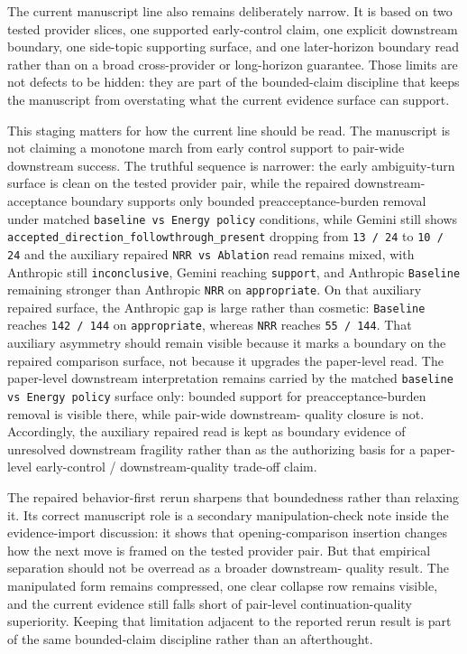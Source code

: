 \documentclass[11pt]{article}
\begin{document}
The current manuscript line also remains deliberately narrow. It is based on
two tested provider slices, one supported early-control claim, one explicit
downstream boundary, one side-topic supporting surface, and one later-horizon
boundary read rather than on a broad cross-provider or long-horizon guarantee.
Those limits are not defects to be hidden: they are part of the bounded-claim
discipline that keeps the manuscript from overstating what the current evidence
surface can support.

This staging matters for how the current line should be read. The manuscript is
not claiming a monotone march from early control support to pair-wide
downstream success. The truthful sequence is narrower: the early ambiguity-turn
surface is clean on the tested provider pair, while the repaired downstream-
acceptance boundary supports only bounded preacceptance-burden removal under
matched \texttt{baseline vs Energy policy} conditions, while Gemini still
shows \texttt{accepted\_direction\_followthrough\_present} dropping from
\texttt{13 / 24} to \texttt{10 / 24} and the auxiliary repaired
\texttt{NRR vs Ablation} read remains mixed, with Anthropic still
\texttt{inconclusive}, Gemini reaching \texttt{support}, and Anthropic
\texttt{Baseline} remaining stronger than Anthropic \texttt{NRR} on
\texttt{appropriate}. On that auxiliary repaired surface, the Anthropic gap is
large rather than cosmetic: \texttt{Baseline} reaches \texttt{142 / 144} on
\texttt{appropriate}, whereas \texttt{NRR} reaches \texttt{55 / 144}. That
auxiliary asymmetry should remain visible because it marks a boundary on the
repaired comparison surface, not because it upgrades the paper-level read. The
paper-level downstream interpretation remains carried by the matched
\texttt{baseline vs Energy policy} surface only: bounded support for
preacceptance-burden removal is visible there, while pair-wide downstream-
quality closure is not. Accordingly, the auxiliary repaired read is kept as
boundary evidence of unresolved downstream fragility rather than as the
authorizing basis for a paper-level early-control / downstream-quality trade-off
claim.

The repaired behavior-first rerun sharpens that boundedness rather than
relaxing it. Its correct manuscript role is a secondary manipulation-check note
inside the evidence-import discussion: it shows that opening-comparison
insertion changes how the next move is framed on the tested provider pair. But
that empirical separation should not be overread as a broader downstream-
quality result. The manipulated form remains compressed, one clear collapse row
remains visible, and the current evidence still falls short of pair-level
continuation-quality superiority. Keeping that limitation adjacent to the
reported rerun result is part of the same bounded-claim discipline rather than
an afterthought.
\end{document}
